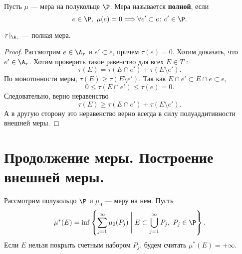 \begin{defn}
    Пусть $ \mu $ --- мера на полукольце $ \P$. Мера называется {\bf полной}, если
	\[
		e \in \P, ~ \mu(e) = 0 \Longrightarrow \forall e' \subset e \colon e' \in \P
	.\] 
\end{defn}
\begin{cor}
    $ \tau\!\mid_{\A_{\tau }} $ --- полная мера.
\end{cor}
\begin{proof}
	Рассмотрим $ e \in \A_{\tau }$ и $ e' \subset e$, причем $ \tau (e) = 0$. Хотим доказать, что $ e' \in \A_{\tau }$.
	Хотим проверить такое равенство для всех $ E \in T$ :
	\[
		\tau (E) = \tau (E\cap e') + \tau (E \setminus e')
	.\] 
	По монотонности меры, $ \tau (E) \ge \tau (E \setminus e')$.
	Так как $ E \cap e' \subset E \cap e \subset e$,
	\[
		0 \le \tau (E \cap e') \le \tau (e) = 0
	.\] 
	Следовательно, верно неравенство 
	\[
		\tau (E) \ge  \tau (E \cap e') + \tau (E \setminus e')
	.\] 
	А в другую сторону это неравенство верно всегда в силу полуаддитивности внешней меры.
\end{proof}

		\fontAwesomeSymbol{\faMapO}

\section{Продолжение меры. Построение внешней меры.}
\begin{name}
    Рассмотрим полукольцо $ \P$ и $ \mu _0$ --- меру на нем. Пусть 
	\[
		\mu ^{*}(E) = \inf \left\{ \sum_{j=1}^{\infty} \mu _0(P_j) \Biggm| E \subset \bigcup_{j=1}^{\infty} P_j, ~ P_j \in \P \right\}
	.\] 
	Если $ E$ нельзя покрыть счетным набором $ P_j$, будем считать $ \mu ^{*} (E)= +\infty$.
\end{name}


